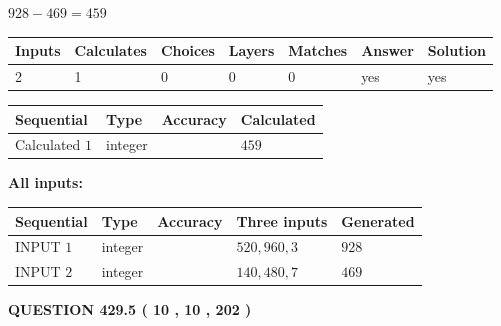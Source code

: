 \documentclass{ctexart}
\begin{document}
 

$ %
928 -  %
469=   %
459$
 
 
\noindent{}
 
 

 
   
   
   
   
\noindent\begin{tabular}{|l|l|l|l|l|l|l|}
 \hline
Inputs & Calculates & Choices & Layers & Matches & Answer & Solution \\ \hline
 2  & 
 1  & 
 0
  & 
 0  & 
 0  & 
  yes & 
  yes 
  \\ \hline
 \end{tabular}
   
   
   
   
\noindent{}
   
   
  
  
\noindent\begin{tabular}{|l|l|l|l|}
\hline
 Sequential & Type & Accuracy & Calculated \\ 
\hline
 
 
  Calculated $  1 $ & integer &  & 
  $ 459 $ 
 \\  \hline  
 \end{tabular}
   
   
   
   
\noindent\vspace{0.1in}\hspace{-0.08in} {\textbf{\Large{All inputs: }}}
   
   
  
  
\noindent\begin{tabular}{|l|l|l|l|l|}
\hline
 Sequential & Type & Accuracy & Three inputs & Generated \\ 
\hline
 
 
  INPUT $  1 $ & integer &  & $
 520
 , 
 960
 , 
 3
 $ & $ 928 $ 
 \\  \hline  
 
 
  INPUT $  2 $ & integer &  & $
 140
 , 
 480
 , 
 7
 $ & $ 469 $ 
 \\  \hline  
 \end{tabular}
   
   
  
\vspace{0.2in}
  
{\textbf{\Large{QUESTION
429.5 
 ( 10 , 10 , 202 )
}}}
  
\end{document}
